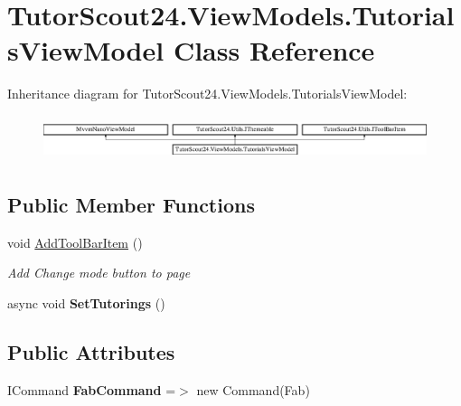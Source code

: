 \hypertarget{class_tutor_scout24_1_1_view_models_1_1_tutorials_view_model}{}\section{Tutor\+Scout24.\+View\+Models.\+Tutorials\+View\+Model Class Reference}
\label{class_tutor_scout24_1_1_view_models_1_1_tutorials_view_model}
Inheritance diagram for Tutor\+Scout24.\+View\+Models.\+Tutorials\+View\+Model\+:\begin{figure}[H]
\begin{center}
\leavevmode
\includegraphics[height=1.319199cm]{class_tutor_scout24_1_1_view_models_1_1_tutorials_view_model}
\end{center}
\end{figure}
\subsection*{Public Member Functions}
\begin{DoxyCompactItemize}
\item 
void \mbox{\hyperlink{class_tutor_scout24_1_1_view_models_1_1_tutorials_view_model_aaf327ff2a3c770d55aa0bfa3b50786a7}{Add\+Tool\+Bar\+Item}} ()
\begin{DoxyCompactList}\small\item\em Add Change mode button to page \end{DoxyCompactList}\item 
\mbox{\label{class_tutor_scout24_1_1_view_models_1_1_tutorials_view_model_a0fe0bb0d7c47e71453de14f8b030fab9}} 
async void {\bfseries Set\+Tutorings} ()
\end{DoxyCompactItemize}
\subsection*{Public Attributes}
\begin{DoxyCompactItemize}
\item 
\mbox{\label{class_tutor_scout24_1_1_view_models_1_1_tutorials_view_model_a719c0216894a8a2324e29230a2571866}} 
I\+Command {\bfseries Fab\+Command} =$>$ new Command(Fab)
\end{DoxyCompactItemize}
